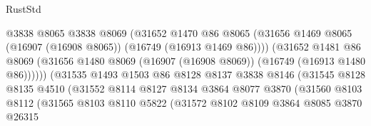 \begin{lexlean}{RustStd}
\begin{coremodule}
                                      @3838
                                      @8065
                                      @3838
                                      @8069
                                      (@31652
                                        @1470
                                        @86
                                        @8065
                                        (@31656
                                          @1469
                                          @8065
                                          (@16907 (@16908 @8065))
                                          (@16749 (@16913 @1469 @86))))
                                      (@31652
                                        @1481
                                        @86
                                        @8069
                                        (@31656
                                          @1480
                                          @8069
                                          (@16907 (@16908 @8069))
                                          (@16749 (@16913 @1480 @86))))))
                                  (@31535
                                    @1493
                                    @1503
                                    @86
                                    @8128
                                    @8137
                                    @3838
                                    @8146
                                    (@31545
                                      @8128
                                      @8135
                                      @4510
                                      (@31552
                                        @8114
                                        @8127
                                        @8134
                                        @3864
                                        @8077
                                        @3870
                                        (@31560
                                          @8103
                                          @8112
                                          (@31565
                                            @8103
                                            @8110
                                            @5822
                                            (@31572
                                              @8102
                                              @8109
                                              @3864
                                              @8085
                                              @3870
                                              @26315

\end{coremodule}
\end{lexlean}
